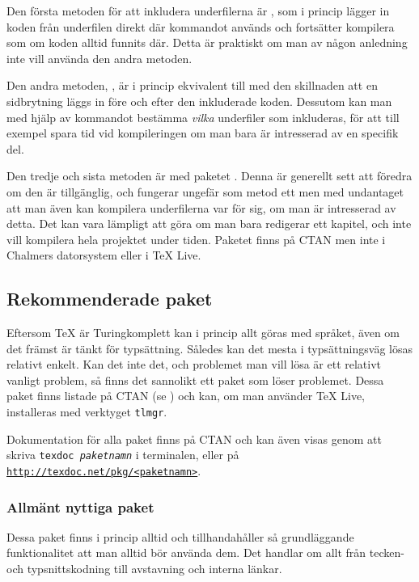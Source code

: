 \documentclass[lang=sv,ptsize=10pt,font=none,nomath,titles=bf,../../a4.tex]{subfiles}
\begin{document}
Den första metoden för att inkludera underfilerna är , som i
princip lägger in koden från underfilen direkt där kommandot används och
fortsätter kompilera som om koden alltid funnits där. Detta är praktiskt
om man av någon anledning inte vill använda den andra metoden.

Den andra metoden, , är i princip ekvivalent till 
med den skillnaden att en sidbrytning läggs in före och efter den 
inkluderade koden. Dessutom kan man med hjälp av kommandot
 bestämma \emph{vilka} underfiler som inkluderas, för att
till exempel spara tid vid kompileringen om man bara är intresserad av en
specifik del.

Den tredje och sista metoden är med paketet . Denna är
generellt sett att föredra om den är tillgänglig, och fungerar ungefär som
metod ett men med undantaget att man även kan kompilera underfilerna
var för sig, om man är intresserad av detta. Det kan vara lämpligt att
göra om man bara redigerar ett kapitel, och inte vill kompilera hela
projektet under tiden. Paketet  finns på CTAN men inte i
Chalmers datorsystem eller i \TeX{} Live.

\subsection{Rekommenderade paket}
Eftersom \TeX{} är Turingkomplett kan i princip allt göras med språket,
även om det främst är tänkt för typsättning. Således kan det mesta i 
typsättningsväg lösas relativt enkelt. Kan det inte det, och problemet
man vill lösa är ett relativt vanligt problem, så finns det sannolikt ett
paket som löser problemet. Dessa paket finns listade på CTAN (se
) och kan, om man använder \TeX{} Live, installeras
med verktyget \texttt{tlmgr}.

Dokumentation för alla paket finns på CTAN och kan
även visas genom att skriva \texttt{texdoc \emph{paketnamn}} i terminalen,
eller på
\href{http://texdoc.net}{\nolinkurl{http://texdoc.net/pkg/<paketnamn>}}.

\subsubsection{Allmänt nyttiga paket}
Dessa paket finns i princip alltid och tillhandahåller så grundläggande
funktionalitet att man alltid bör använda dem. Det handlar om allt från
tecken- och typsnittskodning till avstavning och interna länkar.
\end{document}
